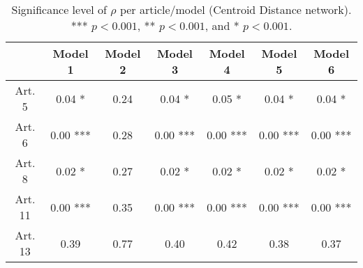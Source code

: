 \begin{table}[ht]
\centering
\begin{tabular}{ccccccc}
  \toprule
 & Model 1 & Model 2 & Model 3 & Model 4 & Model 5 & Model 6 \\ 
  \midrule
Art. 5 & 0.04 * & 0.24   & 0.04 * & 0.05 * & 0.04 * & 0.04 * \\ 
   \midrule
Art. 6 & 0.00 *** & 0.28   & 0.00 *** & 0.00 *** & 0.00 *** & 0.00 *** \\ 
   \midrule
Art. 8 & 0.02 * & 0.27   & 0.02 * & 0.02 * & 0.02 * & 0.02 * \\ 
   \midrule
Art. 11 & 0.00 *** & 0.35   & 0.00 *** & 0.00 *** & 0.00 *** & 0.00 *** \\ 
   \midrule
Art. 13 & 0.39   & 0.77   & 0.40   & 0.42   & 0.38   & 0.37   \\ 
   \bottomrule
\end{tabular}
\caption{Significance level of $\rho$ per article/model (Centroid Distance network). *** $p < 0.001$, ** $p < 0.001$, and * $p < 0.001$.} 
\end{table}
